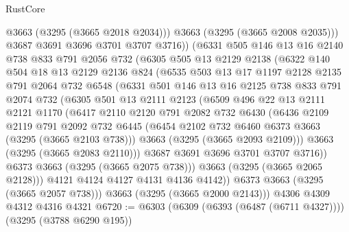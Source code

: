 \begin{lexlean}{RustCore}
\begin{coremodule}
              @3663
              (@3295 (@3665 @2018 @2034)))
            @3663
            (@3295 (@3665 @2008 @2035)))
          @3687
          @3691
          @3696
          @3701
          @3707
          @3716))
      (@6331
        @505
        @146
        @13
        @16
        @2140
        @738
        @833
        @791
        @2056
        @732
        (@6305
          @505
          @13
          @2129
          @2138
          (@6322
            @140
            @504
            @18
            @13
            @2129
            @2136
            @824
            (@6535
              @503
              @13
              @17
              @1197
              @2128
              @2135
              @791
              @2064
              @732
              @6548
              (@6331
                @501
                @146
                @13
                @16
                @2125
                @738
                @833
                @791
                @2074
                @732
                (@6305
                  @501
                  @13
                  @2111
                  @2123
                  (@6509
                    @496
                    @22
                    @13
                    @2111
                    @2121
                    @1170
                    (@6417
                      @2110
                      @2120
                      @791
                      @2082
                      @732
                      @6430
                      (@6436
                        @2109
                        @2119
                        @791
                        @2092
                        @732
                        @6445
                        (@6454 @2102 @732 @6460 @6373 @3663 (@3295 (@3665 @2103 @738)))
                        @3663
                        (@3295 (@3665 @2093 @2109)))
                      @3663
                      (@3295 (@3665 @2083 @2110)))
                    @3687
                    @3691
                    @3696
                    @3701
                    @3707
                    @3716))
                @6373
                @3663
                (@3295 (@3665 @2075 @738)))
              @3663
              (@3295 (@3665 @2065 @2128)))
            @4121
            @4124
            @4127
            @4131
            @4136
            @4142))
        @6373
        @3663
        (@3295 (@3665 @2057 @738)))
      @3663
      (@3295 (@3665 @2000 @2143)))
    @4306
    @4309
    @4312
    @4316
    @4321
@6720 := @6303 (@6309 (@6393 (@6487 (@6711 @4327)))) (@3295 (@3788 @6290 @195))

\end{coremodule}
\end{lexlean}
